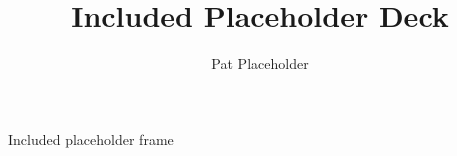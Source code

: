 \documentclass{slides}
\title{Included Placeholder Deck}
\author{Pat Placeholder}
\date{}
\begin{document}
\maketitle

\begin{frame}{Included placeholder frame}
\end{frame}
\end{document}

